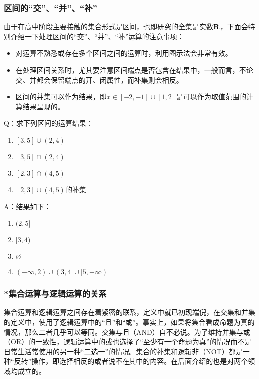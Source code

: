 \subsubsection{区间的“交”、“并”、“补”}

由于在高中阶段主要接触的集合形式是区间，也即研究的全集是实数${\bf R}$，下面会特别介绍一下处理区间的“交”、“并”、“补”运算的注意事项：

\begin{itemize}
\item 对运算不熟悉或存在多个区间之间的运算时，利用图示法会非常有效。
\item 在处理区间关系时，尤其要注意区间端点是否包含在结果中，一般而言，不论交、并都会保留端点的开、闭属性，而补集则会相反。
\item 区间的并集可以作为结果，即$x\in[-2,-1]\cup[1,2]$是可以作为取值范围的计算结果呈现的。
\end{itemize}
\begin{exercise}{}
Q：求下列区间的运算结果：
\begin{enumerate}
\item $[3,5]\cup(2,4)$
\item $[3,5]\cap(2,4)$
\item $[2,3]\cap(4,5)$
\item $[2,3]\cup(4,5)$的补集
\end{enumerate}
A：结果如下：
\begin{enumerate}
\item $(2,5]$
\item $[3,4)$
\item $\varnothing$
\item $(-\infty,2)\cup(3,4]\cup[5,+\infty)$
\end{enumerate}
\end{exercise}

\subsubsection{*集合运算与逻辑运算的关系}

集合运算和逻辑运算之间存在着紧密的联系，定义中就已初现端倪，在交集和并集的定义中，使用了逻辑运算中的“且”和“或”。事实上，如果将集合看成命题为真的情况，那么二者几乎可以等同。交集与且（AND）自不必说。为了维持并集与或（OR）的一致性，逻辑运算中的或也选择了“至少有一个命题为真”的情况而不是日常生活常使用的另一种“二选一”的情况。集合的补集和逻辑非（NOT）都是一种“反转”操作，即选择相反的或者说不在其中的内容。在后面介绍的也是对两个领域均成立的。

